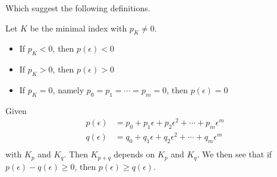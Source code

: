 Which suggest the following definitions.

\begin{definition}\label{def:sign-of-polynomial-in-epsilon}
	Let \(K\) be the minimal index with \(p_K \neq 0\).
	\begin{itemize}
		\item If \(p_K < 0\), then \(p(\epsilon) < 0\)
		\item If \(p_K > 0\), then \(p(\epsilon) > 0\)
		\item If \(p_K = 0\), namely \(p_0 = p_1 = \cdots = p_m = 0\), then \(p(\epsilon) = 0\)
	\end{itemize}
\end{definition}

\begin{note}
	Given
	\[
		\begin{split}
			p(\epsilon) & = p_0 + p_1\epsilon + p_2 \epsilon^2 + \cdots + p_{m}\epsilon^m \\
			q(\epsilon) & = q_0 + q_1\epsilon + q_2 \epsilon^2 + \cdots + q_{m}\epsilon^m \\
		\end{split}
	\]
	with \(K_p\) and \(K_q\). Then \(K_{p+q}\) depends on \(K_p\) and \(K_q\). We then see that if \(p(\epsilon) - q(\epsilon) \geq 0\), then
	\(p(\epsilon) \geq  q(\epsilon)\).
\end{note}

